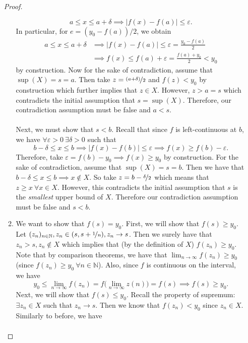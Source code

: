\documentclass{article}
\newcommand{\N}{\mathbb{N}}
\newcommand{\seq}[2]{(#1_{#2})_{#2 \in \N}}
\newcommand{\?}{\stackrel{?}{=}}
\theoremstyle{definition} %
\begin{document}
\begin{itemize}
\begin{proof}
\begin{enumerate}[label=(\roman*)]
            $$a \leq x \leq a + \delta \implies |f(x) - f(a)| \leq \varepsilon.$$
            In particular, for $e = (y_0 - f(a)) / 2$, we obtain
            \begin{align*}
                a \leq x \leq a + \delta &\implies |f(x) - f(a)| \leq \varepsilon = \frac{y_0 - f(a)}{2} \\
                &\implies f(x) \leq f(a) + \varepsilon = \frac{f(a) + y_0}{2} < y_0
            \end{align*}
            by construction. Now for the sake of contradiction, assume that $\sup(X) = s = a$. Then take $z = \nicefrac{(a + \delta)}{2}$ and $f(z) < y_0$ by construction which further implies that $z \in X$. However, $z > a = s$ which contradicts the initial assumption that $s = \sup(X)$. Therefore, our contradiction assumption must be false and $a < s$. \\\\
            Next, we must show that $s < b$. Recall that since $f$ is left-continuous at $b$, we have $\forall \varepsilon > 0 \ \exists \delta > 0$ such that
            $$b - \delta \leq x \leq b \implies |f(x) - f(b)| \leq \varepsilon \implies f(x) \geq f(b) - \varepsilon.$$
            Therefore, take $\varepsilon = f(b) - y_0 \implies f(x) \geq y_0$ by construction. For the sake of contradiction, assume that $\sup(X) = s = b$. Then we have that $b - \delta \leq x \leq b \implies x \not\in X$. So take $z = b - \nicefrac{\delta}{2}$ which means that $z \geq x \ \forall x \in X$. However, this contradicts the initial assumption that $s$ is the \textit{smallest} upper bound of $X$. Therefore our contradiction assumption must be false and $s < b$.
            \item We want to show that $f(s) = y_0$. First, we will show that $f(s) \geq y_0$. Let $\seq{z}{n}, z_n \in (s, s + \nicefrac{1}{n}), z_n \rightarrow s$. Then we surely have that $z_n > s, z_n \not\in X$ which implies that (by the definition of $X$) $f(z_n) \geq y_0$. Note that by comparison theorems, we have that $\lim_{n \to \infty} f(z_n) \geq y_0$ (since $f(z_n) \geq y_0 \ \forall n \in \N$). Also, since $f$ is continuous on the interval, we have
            $$y_0 \leq \lim_{n \to \infty} f(z_n) = f\big(\lim_{n \to \infty} z(n)\big) = f(s) \implies f(s) \geq y_0.$$
            Next, we will show that $f(s) \leq y_0$. Recall the property of supremum: $\exists z_n \in X$ such that $z_n \rightarrow s$. Then we know that $f(z_n) < y_0$ since $z_n \in X$. Similarly to before, we have
            \begin{align*}

\end{align*}
\end{enumerate}
\end{proof}
\end{itemize}
\end{document}
